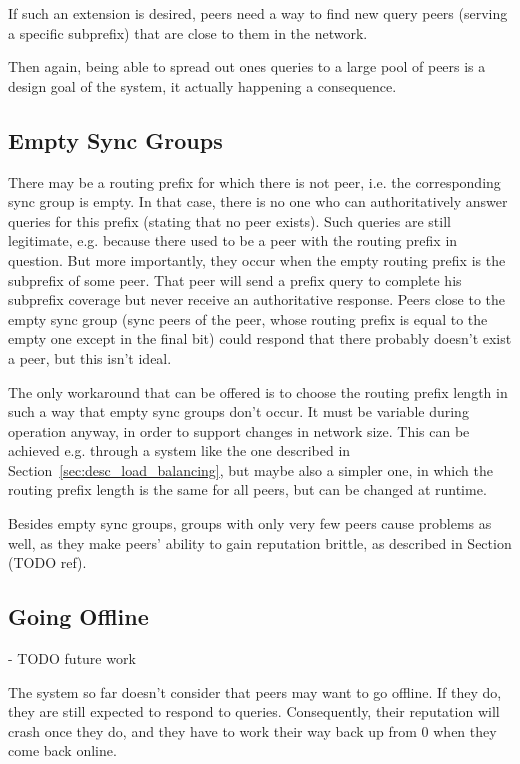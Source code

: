 If such an extension is desired, peers need a way to find new query peers
(serving a specific subprefix) that are close to them in the network.

Then again, being able to spread out ones queries to a large pool of peers is a
design goal of the system, it actually happening a consequence.

\subsection{Empty Sync Groups}
\label{sec:desc_empty_sync_groups}
There may be a routing prefix for which there is not peer, i.e. the
corresponding sync group is empty. In that case, there is no one who can
authoritatively answer queries for this prefix (stating that no peer exists).
Such queries are still legitimate, e.g. because there used to be a peer with the
routing prefix in question. But more importantly, they occur when the empty
routing prefix is the subprefix of some peer. That peer will send a prefix query
to complete his subprefix coverage but never receive an authoritative response.
Peers close to the empty sync group (sync peers of the peer, whose routing
prefix is equal to the empty one except in the final bit) could respond that
there probably doesn't exist a peer, but this isn't ideal.

The only workaround that can be offered is to choose the routing prefix length
in such a way that empty sync groups don't occur. It must be variable during
operation anyway, in order to support changes in network size. This can be
achieved e.g. through a system like the one described in
Section~\ref{sec:desc_load_balancing}, but maybe also a simpler one, in which
the routing prefix length is the same for all peers, but can be changed at
runtime.

Besides empty sync groups, groups with only very few peers cause problems as
well, as they make peers' ability to gain reputation brittle, as described in
Section (TODO ref).

\subsection{Going Offline}
- TODO future work

The system so far doesn't consider that peers may want to go offline. If they
do, they are still expected to respond to queries. Consequently, their
reputation will crash once they do, and they have to work their way back up from
0 when they come back online.

